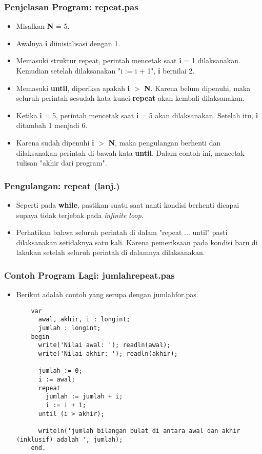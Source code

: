 \documentclass{beamer}
\begin{document}
\begin{frame}
\frametitle{Penjelasan Program: repeat.pas}
\begin{itemize}
  \item Misalkan \textbf{N} = 5.
  \item Awalnya \textbf{i} diinisialisasi dengan 1.
  \item Memasuki struktur repeat, perintah mencetak saat \textbf{i} = 1 dilaksanakan. Kemudian setelah dilaksanakan "i := i + 1", \textbf{i} bernilai 2.
  \item Memasuki \textbf{until}, diperiksa apakah \textbf{i} $>$ \textbf{N}. Karena belum dipenuhi, maka seluruh perintah sesudah kata kunci \textbf{repeat} akan kembali dilaksanakan.
  \item Ketika \textbf{i} = 5, perintah mencetak saat \textbf{i} = 5 akan dilaksanakan. Setelah itu, \textbf{i} ditambah 1 menjadi 6.
  \item Karena sudah dipenuhi \textbf{i} $>$ \textbf{N}, maka pengulangan berhenti dan dilaksanakan perintah di bawah kata \textbf{until}. Dalam contoh ini, mencetak tulisan "akhir dari program".
\end{itemize}
\end{frame}

\begin{frame}
\frametitle{Pengulangan: repeat (lanj.)}
\begin{itemize}
  \item Seperti pada \textbf{while}, pastikan suatu saat nanti kondisi berhenti dicapai supaya tidak terjebak pada \textit{infinite loop}.
  \item Perhatikan bahwa seluruh perintah di dalam "repeat ... until" \alert{pasti} dilaksanakan setidaknya satu kali. Karena pemeriksaan pada kondisi baru di lakukan setelah seluruh perintah di dalamnya dilaksanakan.
\end{itemize}
\end{frame}

\begin{frame}[fragile]
\frametitle{Contoh Program Lagi: jumlahrepeat.pas}
\begin{itemize}
  \item Berikut adalah contoh yang serupa dengan jumlahfor.pas.
  \begin{lstlisting}
    var
      awal, akhir, i : longint;
      jumlah : longint;
    begin
      write('Nilai awal: '); readln(awal);
      write('Nilai akhir: '); readln(akhir);

      jumlah := 0;
      i := awal;
      repeat
        jumlah := jumlah + i;
        i := i + 1;
      until (i > akhir);

      writeln('jumlah bilangan bulat di antara awal dan akhir (inklusif) adalah ', jumlah);
    end.
  \end{lstlisting}
\end{itemize}
\end{frame}
\end{document}
